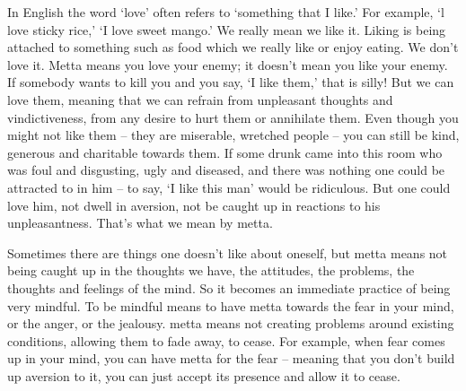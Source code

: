 
In English the word `love' often refers to `something that I like.' For example, `l love sticky rice,' `I love sweet mango.' We really mean we like it. Liking is being attached to something such as food which we really like or enjoy eating. We don't love it. Metta means you love your enemy; it doesn't mean you like your enemy. If somebody wants to kill you and you say, `I like them,' that is silly! But we can love them, meaning that we can refrain from unpleasant thoughts and vindictiveness, from any desire to hurt them or annihilate them. Even though you might not like them -- they are miserable, wretched people -- you can still be kind, generous and charitable towards them. If some drunk came into this room who was foul and disgusting, ugly and diseased, and there was nothing one could be attracted to in him -- to say, `I like this man' would be ridiculous. But one could love him, not dwell in aversion, not be caught up in reactions to his unpleasantness. That's what we mean by metta.

Sometimes there are things one doesn't like about oneself, but metta means not being caught up in the thoughts we have, the attitudes, the problems, the thoughts and feelings of the mind. So it becomes an immediate practice of being very mindful. To be mindful means to have metta towards the fear in your mind, or the anger, or the jealousy. metta means not creating problems around existing conditions, allowing them to fade away, to cease. For example, when fear comes up in your mind, you can have metta for the fear -- meaning that you don't build up aversion to it, you can just accept its presence and allow it to cease.

